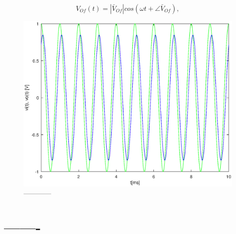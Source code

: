 \begin{equation}
  V_{Of}(t) = |\bar{V}_{Of}| cos(\omega t + \angle \bar{V}_{Of}),
  \label{eq:vo_for}
\end{equation}

\begin{figure}[h] \centering
\includegraphics[width=0.8\linewidth]{forced.eps}
\caption{------------}
\label{fig:forced}
\end{figure}

\section{-------}

